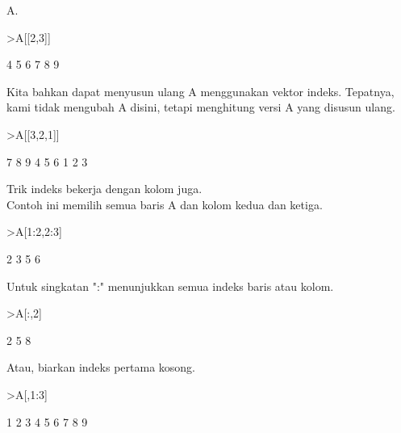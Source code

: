 \documentclass[a4paper,10pt]{article}
\begin{document}
\begin{eulernotebook}
\begin{eulercomment}
\begin{eulercomment}
\begin{eulercomment}
\begin{eulercomment}
\begin{eulercomment}
A.
\end{eulercomment}
\begin{eulerprompt}
>A[[2,3]]
\end{eulerprompt}
\begin{euleroutput}
              4             5             6 
              7             8             9 
\end{euleroutput}
\begin{eulercomment}
Kita bahkan dapat menyusun ulang A menggunakan vektor indeks.
Tepatnya, kami tidak mengubah A disini, tetapi menghitung versi A yang
disusun ulang.
\end{eulercomment}
\begin{eulerprompt}
>A[[3,2,1]]
\end{eulerprompt}
\begin{euleroutput}
              7             8             9 
              4             5             6 
              1             2             3 
\end{euleroutput}
\begin{eulercomment}
Trik indeks bekerja dengan kolom juga.\\
Contoh ini memilih semua baris A dan kolom kedua dan ketiga.
\end{eulercomment}
\begin{eulerprompt}
>A[1:2,2:3]
\end{eulerprompt}
\begin{euleroutput}
              2             3 
              5             6 
\end{euleroutput}
\begin{eulercomment}
Untuk singkatan ":" menunjukkan semua indeks baris atau kolom.
\end{eulercomment}
\begin{eulerprompt}
>A[:,2]
\end{eulerprompt}
\begin{euleroutput}
              2 
              5 
              8 
\end{euleroutput}
\begin{eulercomment}
Atau, biarkan indeks pertama kosong.
\end{eulercomment}
\begin{eulerprompt}
>A[,1:3]
\end{eulerprompt}
\begin{euleroutput}
              1             2             3 
              4             5             6 
              7             8             9 
\end{euleroutput}

\end{eulercomment}
\end{eulercomment}
\end{eulercomment}
\end{eulercomment}
\end{eulernotebook}
\end{document}
